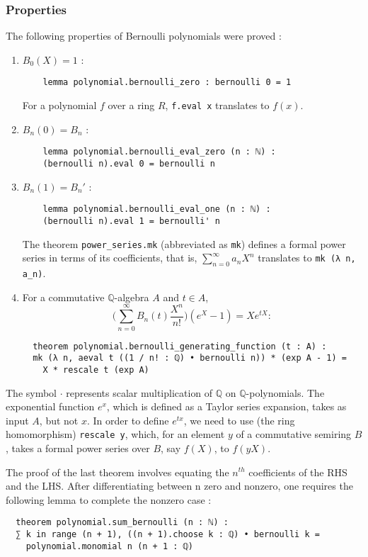 \documentclass[a4paper,UKenglish,cleveref, autoref, thm-restate]{lipics-v2021}
\newcommand{\lean}[1]{\texttt{#1}\xspace} %
\begin{document}
\subsubsection{Properties}
The following properties of Bernoulli polynomials were proved :
\begin{enumerate}
  \item $ B_0(X) = 1 $ : \begin{lstlisting}
    lemma polynomial.bernoulli_zero : bernoulli 0 = 1
  \end{lstlisting}
  For a polynomial $f$ over a ring $R$, \lean{f.eval x} translates to $f(x)$.
  \item $ B_n(0) = B_n $ : \begin{lstlisting}
    lemma polynomial.bernoulli_eval_zero (n : ℕ) : 
    (bernoulli n).eval 0 = bernoulli n
  \end{lstlisting}
  \item $ B_n(1) = B_n' $ : \begin{lstlisting}
    lemma polynomial.bernoulli_eval_one (n : ℕ) : 
    (bernoulli n).eval 1 = bernoulli' n
  \end{lstlisting}
  The theorem \lean{power\_series.mk} (abbreviated as \lean{mk}) defines a formal power series in terms of its
  coefficients, that is, $\sum_{n = 0}^{\infty} a_n X^n$ translates to \lean{mk (λ n, a\_n)}.
  \item For a commutative $\mathbb{Q}$-algebra $A$ and $t \in A$, 
  $$ \bigg( \sum_{n = 0}^{\infty} B_n(t) \frac{X^n}{n!} \bigg) (e^X - 1) = X e^{tX} : $$
  \begin{lstlisting}
  theorem polynomial.bernoulli_generating_function (t : A) :
  mk (λ n, aeval t ((1 / n! : ℚ) • bernoulli n)) * (exp A - 1) = 
    X * rescale t (exp A)
  \end{lstlisting}
\end{enumerate} 
The symbol \lean{$\cdot$} represents scalar multiplication of $\mathbb{Q}$ on $\mathbb{Q}$-polynomials. 
The exponential function $e^{x}$, which is defined as a Taylor series expansion,
takes as input $A$, but not $x$. In order to define $e^{tx}$, we need to use
(the ring homomorphism) \lean{rescale y}, which, for an element $y$ of a commutative semiring $B$,
takes a formal power series over $B$, say $f(X)$, to $f(yX)$. 

The proof of the last theorem involves equating the $n^{th}$ coefficients of the RHS and the LHS.
After differentiating between n zero and nonzero, one requires the following lemma to complete the
nonzero case :
\begin{lstlisting}
  theorem polynomial.sum_bernoulli (n : ℕ) :
  ∑ k in range (n + 1), ((n + 1).choose k : ℚ) • bernoulli k =
    polynomial.monomial n (n + 1 : ℚ)
\end{lstlisting}
\end{document}
